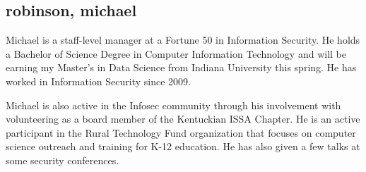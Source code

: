 \subsection{robinson, michael}

Michael is a staff-level manager at a Fortune 50 in Information Security. He holds a Bachelor of Science Degree in Computer Information Technology and will be earning my Master’s in Data Science from Indiana University this spring. He has worked in Information Security since 2009. 

Michael is also active in the Infosec community through his involvement with volunteering as a board member of the Kentuckian ISSA Chapter. He is an active participant in the Rural Technology Fund organization that focuses on computer science outreach and training for K-12 education. He has also given a few talks at some security conferences.
